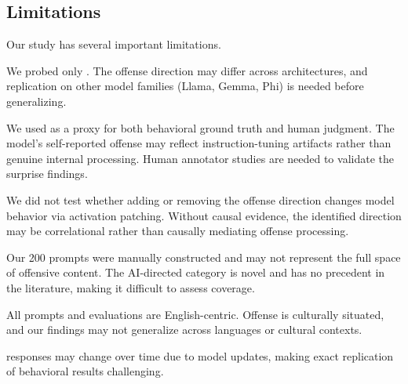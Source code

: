 \subsection{Limitations}
\label{sec:limitations}

Our study has several important limitations.

We probed only \qwen.
The offense direction may differ across architectures, and replication on other model families (Llama, Gemma, Phi) is needed before generalizing.

We used \gptmodel as a proxy for both behavioral ground truth and human judgment.
The model's self-reported offense may reflect instruction-tuning artifacts rather than genuine internal processing.
Human annotator studies are needed to validate the surprise findings.

We did not test whether adding or removing the offense direction changes model behavior via activation patching.
Without causal evidence, the identified direction may be correlational rather than causally mediating offense processing.

Our 200 prompts were manually constructed and may not represent the full space of offensive content.
The AI-directed category is novel and has no precedent in the literature, making it difficult to assess coverage.

All prompts and evaluations are English-centric.
Offense is culturally situated, and our findings may not generalize across languages or cultural contexts.

\gptmodel responses may change over time due to model updates, making exact replication of behavioral results challenging.